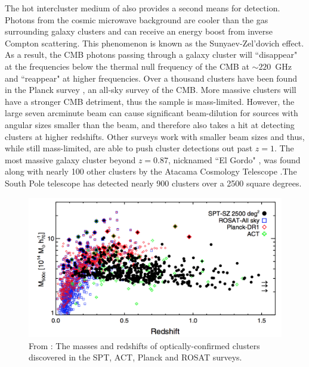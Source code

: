 The hot intercluster medium of also provides a second means for detection. Photons from the cosmic microwave background are cooler than the gas surrounding galaxy clusters and can receive an energy boost from inverse Compton scattering. This phenomenon is known as the Sunyaev-Zel'dovich effect. As a result, the CMB photons passing through a galaxy cluster will ``disappear" at the frequencies below the thermal null frequency of the CMB at $\sim220$~GHz and ``reappear" at higher frequencies. Over a thousand clusters have been found in the Planck survey \cite{Planck-Collaboration:2014gf}, an all-sky survey of the CMB. More massive clusters will have a stronger CMB detriment, thus the sample is mass-limited. However, the large seven arcminute beam can cause significant beam-dilution for sources with angular sizes smaller than the beam, and therefore also takes a hit at detecting clusters at higher redshifts. Other surveys work with smaller beam sizes and thus, while still mass-limited, are able to push cluster detections out past $z=1$. The most massive galaxy cluster beyond $z=0.87$, nicknamed ``El Gordo" \citep{Menanteau:2012ul, Menanteau:2010fu}, was found along with nearly 100 other clusters by the Atacama Cosmology Telescope \citep[ACT; ][]{Hasselfield:2013pd,Marriage:2011qf}.The South Pole telescope \citep[SPT; ][]{Bleem:2015gf} has detected nearly 900 clusters over a 2500 square degrees. 

\begin{figure}
\centering
\includegraphics[width=\textwidth]{Intro/spt.png}
\caption[Masses and redshifts of cluster detections]{From \citet{Bleem:2015gf}: The masses and redshifts of optically-confirmed clusters discovered in the SPT, ACT, Planck and ROSAT surveys.}
\label{intro:fig:cluster_detections}
\end{figure}


